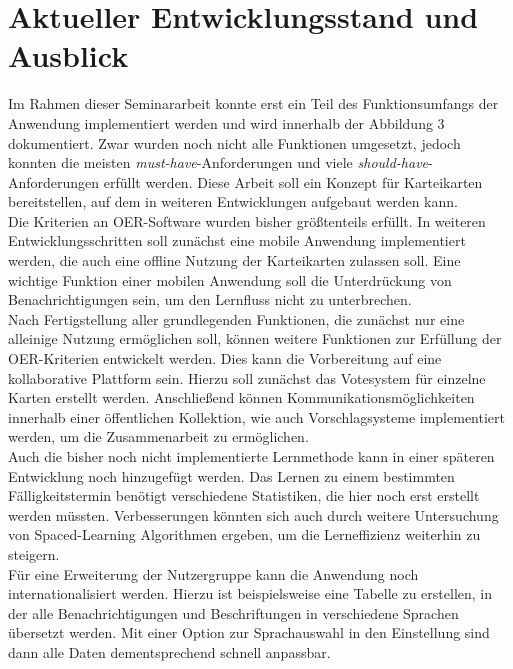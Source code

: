 \section{Aktueller Entwicklungsstand und Ausblick}
Im Rahmen dieser Seminararbeit konnte erst ein Teil des Funktionsumfangs der Anwendung implementiert werden und wird innerhalb der Abbildung 3 dokumentiert. Zwar wurden noch nicht alle Funktionen umgesetzt, jedoch konnten die meisten \emph{must-have}-Anforderungen und viele \emph{should-have}-Anforderungen erfüllt werden. Diese Arbeit soll ein Konzept für Karteikarten bereitstellen, auf dem in weiteren Entwicklungen aufgebaut werden kann. \\

\noindent Die Kriterien an OER-Software wurden bisher größtenteils erfüllt. In weiteren Entwicklungsschritten soll zunächst eine mobile Anwendung implementiert werden, die auch eine offline Nutzung der Karteikarten zulassen soll. Eine wichtige Funktion einer mobilen Anwendung soll die Unterdrückung von Benachrichtigungen sein, um den Lernfluss nicht zu unterbrechen. \\

\noindent Nach Fertigstellung aller grundlegenden Funktionen, die zunächst nur eine alleinige Nutzung ermöglichen soll, können weitere Funktionen zur Erfüllung der OER-Kriterien entwickelt werden. Dies kann die Vorbereitung auf eine kollaborative Plattform sein. Hierzu soll zunächst das Votesystem für einzelne Karten erstellt werden. Anschließend können Kommunikationsmöglichkeiten innerhalb einer öffentlichen Kollektion, wie auch Vorschlagsysteme implementiert werden, um die Zusammenarbeit zu ermöglichen.\\

\noindent Auch die bisher noch nicht implementierte Lernmethode kann in einer späteren Entwicklung noch hinzugefügt werden. Das Lernen zu einem bestimmten Fälligkeitstermin benötigt verschiedene Statistiken, die hier noch erst erstellt werden müssten. Verbesserungen könnten sich auch durch weitere Untersuchung von Spaced-Learning Algorithmen ergeben, um die Lerneffizienz weiterhin zu steigern. \\

\noindent Für eine Erweiterung der Nutzergruppe kann die Anwendung noch internationalisiert werden. Hierzu ist beispielsweise eine Tabelle zu erstellen, in der alle Benachrichtigungen und  Beschriftungen in verschiedene Sprachen übersetzt werden. Mit einer Option zur Sprachauswahl in den Einstellung sind dann alle Daten dementsprechend schnell anpassbar. \\

